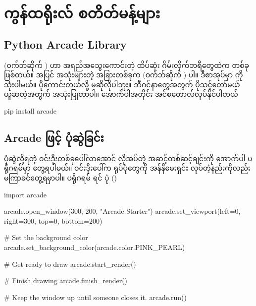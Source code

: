 \chapter{ကွန်ထရိုးလ် စတိတ်မန့်များ}



\section{Python Arcade Library}
 (ဝက်ဘ်ဆိုက် ) ဟာ အရည်အသွေးကောင်းတဲ့ ထိပ်ဆုံး  ဂိမ်းလိုက်ဘရီတွေထဲက တစ်ခုဖြစ်တယ်။  အပြင် အသုံးများတဲ့ အခြားတစ်ခုက  (ဝက်ဘ်ဆိုက် ) ပါ။ ဒီစာအုပ်မှာ  ကို သုံးပါမယ်။  ပိုကောင်းတယ်လို့ မဆိုလိုပါဘူး။ ဘီဂင်နာတွေအတွက် ပိုသင့်တော်မယ် ယူဆတဲ့အတွက် အသုံးပြုတာပါ။ အောက်ပါအတိုင်း အင်စတောလ်လုပ်နိုင်ပါတယ်
\begin{codetxt}
pip install arcade
\end{codetxt}

\section{Arcade ဖြင့် ပုံဆွဲခြင်း}
ပုံဆွဲလို့ရတဲ့ ဝင်းဒိုးတစ်ခုပေါ်လာအောင်  လိုအပ်တဲ့ အဆင့်တစ်ဆင့်ချင်းကို  အောက်ပါ  ပရိုဂရမ်မှာ တွေ့ရပါမယ်။ ဝင်းဒိုးပေါ်က ရုပ်ပုံတွေကို အန်နီမေးရှင်း  လုပ်တဲ့နည်းကိုလည်း မကြာခင်တွေ့ရမှာပါ။ ပရိုဂရမ်  ရင်
ပုံ (\fRefNo{\ref{fig:ch07starter}})
%
\begin{py}
import arcade

arcade.open_window(300, 200, "Arcade Starter")
arcade.set_viewport(left=0, right=300, top=0, bottom=200)

# Set the background color
arcade.set_background_color(arcade.color.PINK_PEARL)

# Get ready to draw
arcade.start_render()

# Finish drawing
arcade.finish_render()

# Keep the window up until someone closes it.
arcade.run()
\end{py}
%

\begin{figure}[tb!]
\caption{}
\label{fig:ch07starter}
\end{figure}

